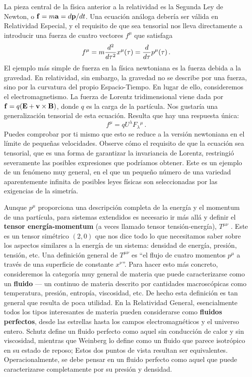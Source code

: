 \documentclass[11pt,b5paper,openany,twoside]{book}
\newcommand{\mn}{{\mu\nu}}
\begin{document}
La pieza central de la física anterior a la relatividad es la Segunda Ley de Newton, o ${\bf f}=m{\bf a} = d{\bf p}/dt$.
Una ecuación análoga debería ser válida en Relatividad Especial, y el requisito de que sea tensorial nos lleva directamente a introducir una fuerza de cuatro vectores $f^\mu$ que satisfaga
\begin{equation}
f^\mu = m{{d^2}\over{d\tau^2}}x^\mu(\tau) = {{d}\over{d\tau}}
p^\mu(\tau)\,.\label{1.102}
\end{equation}
El ejemplo más simple de fuerza en la física newtoniana es la fuerza debida a la gravedad.
En relatividad, sin embargo, la gravedad no se describe por una fuerza, sino por la curvatura del propio Espacio-Tiempo.
En lugar de ello, consideremos el electromagnetismo.
La fuerza de Lorentz tridimensional viene dada por ${\bf f} = q({\bf E} + {\bf v}\times{\bf B})$, donde $q$ es la carga de la partícula.
Nos gustaría una generalización tensorial de esta ecuación.
Resulta que hay una respuesta única:
\begin{equation}
f^\mu = qU^\lambda F_\lambda{}^\mu\,.\label{1.103}
\end{equation}
Puedes comprobar por ti mismo que esto se reduce a la versión newtoniana en el límite de pequeñas velocidades.
Observe cómo el requisito de que la ecuación sea tensorial, que es una forma de garantizar la invariancia de Lorentz, restringió severamente las posibles expresiones que podríamos obtener.
Este es un ejemplo de un fenómeno muy general, en el que un pequeño número de una variedad aparentemente infinita de posibles leyes físicas son seleccionadas por las exigencias de la simetría.

Aunque $p^\mu$ proporciona una descripción completa de la energía y el momentum de una partícula, para sistemas extendidos es necesario ir más allá y definir el {\bf tensor energía-momentum} (a veces llamado tensor tensión-energía), $T^\mn$ .
Este es un tensor simétrico $(2,0)$ que nos dice todo lo que necesitamos saber sobre los aspectos similares a la energía de un sistema: densidad de energía, presión, tensión, etc.
Una definición general de $T^\mn$ es ``el flujo de cuatro momentos $p^\mu$ a través de una superficie de constante $x^\nu$''.
Para hacer esto más concreto, consideremos la categoría muy general de materia que puede caracterizarse como un {\bf fluido} --- un continuo de materia descrito por cantidades macroscópicas como temperatura, presión, entropía, viscosidad, etc.
De hecho esta definición es tan general que resulta de poca utilidad.
En la Relatividad General, esencialmente todos los tipos interesantes de materia pueden considerarse como {\bf fluidos perfectos}, desde las estrellas hasta los campos electromagnéticos y el universo entero.
Schutz define un fluido perfecto como aquel sin conducción de calor y sin viscosidad, mientras que Weinberg lo define como un fluido que parece isotrópico en su estado de reposo; Estos dos puntos de vista resultan ser equivalentes.
Operacionalmente, se debe pensar en un fluido perfecto como aquel que puede caracterizarse completamente por su presión y densidad.
\end{document}
